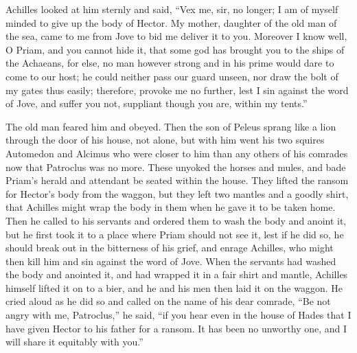 Achilles looked at him sternly and said, “Vex me, sir, no longer; I am of
myself minded to give up the body of Hector. My mother, daughter of the
old man of the sea, came to me from Jove to bid me deliver it to you.
Moreover I know well, O Priam, and you cannot hide it, that some god has
brought you to the ships of the Achaeans, for else, no man however strong
and in his prime would dare to come to our host; he could neither pass our
guard unseen, nor draw the bolt of my gates thus easily; therefore,
provoke me no further, lest I sin against the word of Jove, and suffer you
not, suppliant though you are, within my tents.”

The old man feared him and obeyed. Then the son of Peleus sprang like a
lion through the door of his house, not alone, but with him went his two
squires Automedon and Alcimus who were closer to him than any others of
his comrades now that Patroclus was no more. These unyoked the horses and
mules, and bade Priam’s herald and attendant be seated within the house.
They lifted the ransom for Hector’s body from the waggon, but they left
two mantles and a goodly shirt, that Achilles might wrap the body in them
when he gave it to be taken home. Then he called to his servants and
ordered them to wash the body and anoint it, but he first took it to a
place where Priam should not see it, lest if he did so, he should break
out in the bitterness of his grief, and enrage Achilles, who might then
kill him and sin against the word of Jove. When the servants had washed
the body and anointed it, and had wrapped it in a fair shirt and mantle,
Achilles himself lifted it on to a bier, and he and his men then laid it
on the waggon. He cried aloud as he did so and called on the name of his
dear comrade, “Be not angry with me, Patroclus,” he said, “if you hear
even in the house of Hades that I have given Hector to his father for a
ransom. It has been no unworthy one, and I will share it equitably with
you.”

